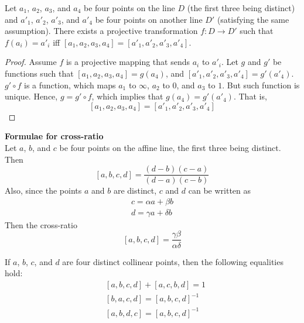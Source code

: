 \begin{prop}
  Let $a_1$, $a_2$, $a_3$, and $a_4$ be four points on the line $D$ (the first three being
  distinct) and $a'_1$, $a'_2$, $a'_3$, and $a'_4$ be four points on another line $D'$
  (satisfying the same assumption). There exists a projective transformation $f\colon D \to D'$
  such that $f(a_i)=a'_i$ iff $[a_1,a_2,a_3,a_4]=[a'_1,a'_2,a'_3,a'_4]$.
\end{prop}

\begin{proof}
  Assume $f$ is a projective mapping that sends $a_i$ to $a'_i$. Let $g$ and $g'$ be functions
  such that $[a_1,a_2,a_3,a_4]=g(a_4)$, and $[a'_1,a'_2,a'_3,a'_4]=g'(a'_4)$. $g'\circ f$ is a
  function, which maps $a_1$ to $\infty$, $a_2$ to $0$, and $a_3$ to $1$. But such function is
  unique. Hence, $g=g'\circ f$, which implies that $g(a_4)=g'(a'_4)$. That is,
  \[
    [a_1,a_2,a_3,a_4]=[a'_1,a'_2,a'_3,a'_4]
  \]
\end{proof}

\begin{remark} \textbf{Formulae for cross-ratio}\\
  Let $a$, $b$, and $c$ be four points on the affine line, the first three being distinct. Then
  \[
    [a,b,c,d]=\frac{(d-b)(c-a)}{(d-a)(c-b)}
  \]
  Also, since the points $a$ and $b$ are distinct, $c$ and $d$ can be written as
  \begin{align*}
    c=\alpha a+\beta b \\
    d=\gamma a+\delta b
  \end{align*}
  Then the cross-ratio
  \[
    [a,b,c,d]=\frac{\gamma\beta}{\alpha\delta}
  \]
\end{remark}

\begin{prop}
  If $a$, $b$, $c$, and $d$ are four distinct collinear points, then the following equalities
  hold:
  \begin{align*}
    &\left[a,b,c,d\right]+\left[a,c,b,d\right]=1 \\
    &\left[b,a,c,d\right]=\left[a,b,c,d\right]^{-1} \\
    &\left[a,b,d,c\right]=\left[a,b,c,d\right]^{-1}
  \end{align*}
\end{prop}

